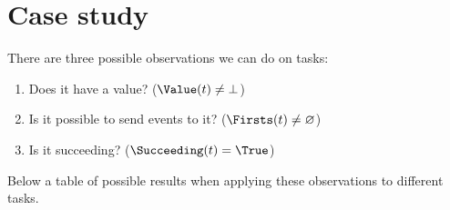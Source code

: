 
\section{Case study}

There are three possible observations we can do on tasks:
\begin{enumerate}
  \item Does it have a value? ($\Value(t) \neq \bot$)
  \item Is it possible to send events to it? ($\Firsts(t) \neq \nothing$)
  \item Is it succeeding? ($\Succeeding(t) = \True$)
\end{enumerate}
Below a table of possible results when applying these observations to different tasks.

